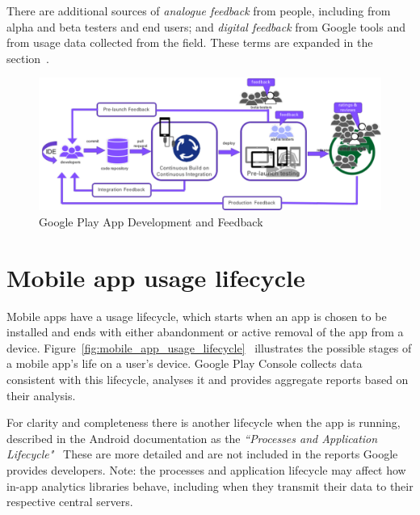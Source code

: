 There are additional sources of \emph{analogue feedback} from people, including from alpha and beta testers and end users; and \emph{digital feedback} from Google tools and from usage data collected from the field. These terms are expanded in the section~\href{analogue-and-digital-feedback}{\emph{}}.

\begin{figure}
    \includegraphics[width=\linewidth]{images/google-play-app-development.pdf}
    \caption{Google Play App Development and Feedback}
    \label{fig:google-play-app-development-and-feedback}
\end{figure}


\section{Mobile app usage lifecycle}
Mobile apps have a usage lifecycle, which starts when an app is chosen to be installed and ends with either abandonment or active removal of the app from a device. Figure~\ref{fig:mobile_app_usage_lifecycle}~ illustrates the possible stages of a mobile app's life on a user's device. Google Play Console collects data consistent with this lifecycle, analyses it and provides aggregate reports based on their analysis. 

For clarity and completeness there is another lifecycle when the app is running, described in the Android documentation as the \emph{``Processes and Application Lifecycle"}~ These are more detailed and are not included in the reports Google provides developers. %
Note: the processes and application lifecycle may affect how in-app analytics libraries behave, including when they transmit their data to their respective central servers.


